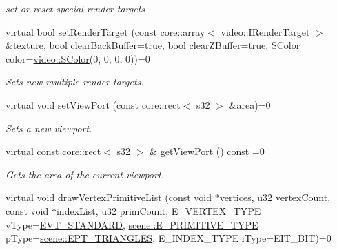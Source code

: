 \begin{DoxyCompactItemize}
\begin{DoxyCompactList}\small\item\em set or reset special render targets \end{DoxyCompactList}\item 
\mbox{\label{classirr_1_1video_1_1IVideoDriver_a1e2bd871ef54ae9bf16c3a49b318d777}} 
virtual bool \hyperlink{classirr_1_1video_1_1IVideoDriver_a1e2bd871ef54ae9bf16c3a49b318d777}{set\+Render\+Target} (const \hyperlink{classirr_1_1core_1_1array}{core\+::array}$<$ video\+::\+I\+Render\+Target $>$ \&texture, bool clear\+Back\+Buffer=true, bool \hyperlink{classirr_1_1video_1_1IVideoDriver_a2036fe0a27dbd1a123ff5aedb07373a5}{clear\+Z\+Buffer}=true, \hyperlink{classirr_1_1video_1_1SColor}{S\+Color} color=\hyperlink{classirr_1_1video_1_1SColor}{video\+::\+S\+Color}(0, 0, 0, 0))=0
\begin{DoxyCompactList}\small\item\em Sets new multiple render targets. \end{DoxyCompactList}\item 
virtual void \hyperlink{classirr_1_1video_1_1IVideoDriver_af03cf9b67bb7b43a8021bbe4baa78a08}{set\+View\+Port} (const \hyperlink{classirr_1_1core_1_1rect}{core\+::rect}$<$ \hyperlink{namespaceirr_ac66849b7a6ed16e30ebede579f9b47c6}{s32} $>$ \&area)=0
\begin{DoxyCompactList}\small\item\em Sets a new viewport. \end{DoxyCompactList}\item 
virtual const \hyperlink{classirr_1_1core_1_1rect}{core\+::rect}$<$ \hyperlink{namespaceirr_ac66849b7a6ed16e30ebede579f9b47c6}{s32} $>$ \& \hyperlink{classirr_1_1video_1_1IVideoDriver_aa21810374736559e937fcad30ac699b4}{get\+View\+Port} () const =0
\begin{DoxyCompactList}\small\item\em Gets the area of the current viewport. \end{DoxyCompactList}\item 
virtual void \hyperlink{classirr_1_1video_1_1IVideoDriver_ab18ac3ba8b6dbaa4437c5eb3b1e2f4fb}{draw\+Vertex\+Primitive\+List} (const void $\ast$vertices, \hyperlink{namespaceirr_a0416a53257075833e7002efd0a18e804}{u32} vertex\+Count, const void $\ast$index\+List, \hyperlink{namespaceirr_a0416a53257075833e7002efd0a18e804}{u32} prim\+Count, \hyperlink{namespaceirr_1_1video_a0e3b59e025e0d0db0ed2ee0ce904deac}{E\+\_\+\+V\+E\+R\+T\+E\+X\+\_\+\+T\+Y\+PE} v\+Type=\hyperlink{namespaceirr_1_1video_a0e3b59e025e0d0db0ed2ee0ce904deaca921f287a4f48d612a5be2d89453ca262}{E\+V\+T\+\_\+\+S\+T\+A\+N\+D\+A\+RD}, \hyperlink{namespaceirr_1_1scene_a5d7de82f2169761194b2f44d95cdc1dc}{scene\+::\+E\+\_\+\+P\+R\+I\+M\+I\+T\+I\+V\+E\+\_\+\+T\+Y\+PE} p\+Type=\hyperlink{namespaceirr_1_1scene_a5d7de82f2169761194b2f44d95cdc1dca6c884c4de3210b3ed36c99fb828ce376}{scene\+::\+E\+P\+T\+\_\+\+T\+R\+I\+A\+N\+G\+L\+ES}, E\+\_\+\+I\+N\+D\+E\+X\+\_\+\+T\+Y\+PE i\+Type=E\+I\+T\+\_\+B\+IT)=0

\end{DoxyCompactItemize}
